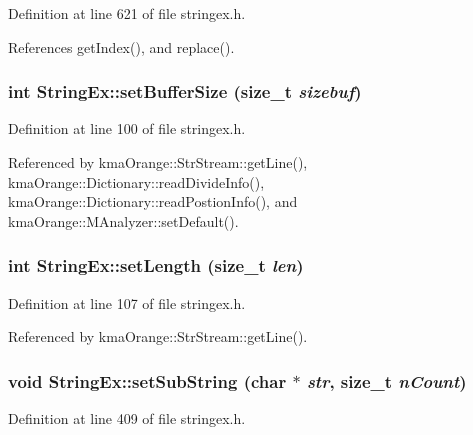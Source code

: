 Definition at line 621 of file stringex.h.

References getIndex(), and replace().\hypertarget{classStringEx_5e44f7dfc41db9f4ff1e25a353464ff0}{
\subsubsection[{setBufferSize}]{\setlength{\rightskip}{0pt plus 5cm}int StringEx::setBufferSize (size\_\-t {\em sizebuf})}}
\label{classStringEx_5e44f7dfc41db9f4ff1e25a353464ff0}




Definition at line 100 of file stringex.h.

Referenced by kmaOrange::StrStream::getLine(), kmaOrange::Dictionary::readDivideInfo(), kmaOrange::Dictionary::readPostionInfo(), and kmaOrange::MAnalyzer::setDefault().\hypertarget{classStringEx_0584545ceedd9c318a1c59bb0e346001}{
\subsubsection[{setLength}]{\setlength{\rightskip}{0pt plus 5cm}int StringEx::setLength (size\_\-t {\em len})}}
\label{classStringEx_0584545ceedd9c318a1c59bb0e346001}




Definition at line 107 of file stringex.h.

Referenced by kmaOrange::StrStream::getLine().\hypertarget{classStringEx_d9f3f0708b320587c5b7ec9ec473855e}{
\subsubsection[{setSubString}]{\setlength{\rightskip}{0pt plus 5cm}void StringEx::setSubString (char $\ast$ {\em str}, \/  size\_\-t {\em nCount})}}
\label{classStringEx_d9f3f0708b320587c5b7ec9ec473855e}




Definition at line 409 of file stringex.h.

